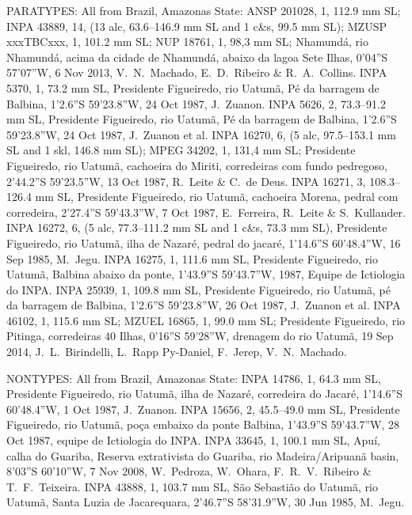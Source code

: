 \documentclass[12pt]{article}
\begin{document}
\noindent PARATYPES: All from Brazil, Amazonas State: ANSP 201028, 1, 112.9 mm SL; INPA 43889, 14, (13 alc, 63.6--146.9 mm SL and 1 c\&s, 99.5 mm SL); MZUSP xxxTBCxxx, 1, 101.2 mm SL; NUP 18761, 1, 98,3 mm SL; Nhamundá, rio Nhamundá, acima da cidade de Nhamundá, abaixo da lagoa Sete Ilhas, 0'04''S 57'07''W, 6 Nov 2013, V.\ N.\ Machado, E.\ D.\ Ribeiro \& R.\ A.\ Collins. %
INPA 5370, 1, 73.2 mm SL, Presidente Figueiredo, rio Uatumã, Pé da barragem de Balbina, 1’2.6”S 59’23.8”W, 24 Oct 1987, J.\ Zuanon. %
INPA 5626, 2, 73.3--91.2 mm SL, Presidente Figueiredo, rio Uatumã, Pé da barragem de Balbina, 1’2.6”S 59’23.8”W, 24 Oct 1987, J.\ Zuanon et al. %
INPA 16270, 6, (5 alc, 97.5--153.1 mm SL and 1 skl, 146.8 mm SL); MPEG 34202, 1, 131,4 mm SL; Presidente Figueiredo, rio Uatumã, cachoeira do Miriti, corredeiras com fundo pedregoso, 2’44.2”S 59’23.5”W, 13 Oct 1987, R.\ Leite \& C.\ de Deus. %
INPA 16271, 3, 108.3--126.4 mm SL, Presidente Figueiredo, rio Uatumã, cachoeira Morena, pedral com corredeira, 2’27.4”S 59’43.3”W, 7 Oct 1987, E.\ Ferreira, R.\ Leite \& S.\ Kullander. %
INPA 16272, 6, (5 alc, 77.3--111.2 mm SL and 1 c\&s, 73.3 mm SL), Presidente Figueiredo, rio Uatumã, ilha de Nazaré, pedral do jacaré, 1’14.6”S 60’48.4”W, 16 Sep 1985, M.\ Jegu. %
INPA 16275, 1, 111.6 mm SL, Presidente Figueiredo, rio Uatumã, Balbina abaixo da ponte, 1’43.9”S 59’43.7”W, 1987, Equipe de Ictiologia do INPA. %
INPA 25939, 1, 109.8 mm SL, Presidente Figueiredo, rio Uatumã, pé da barragem de Balbina, 1’2.6”S 59’23.8”W, 26 Oct 1987, J.\ Zuanon et al. %
INPA 46102, 1, 115.6 mm SL; MZUEL 16865, 1, 99.0 mm SL; Presidente Figueiredo, rio Pitinga, corredeiras 40 Ilhas, 0’16”S 59’28”W, drenagem do rio Uatumã, 19 Sep 2014, J.\ L.\ Birindelli, L.\ Rapp Py-Daniel, F.\ Jerep, V.\ N.\ Machado.\\
\bigskip

\noindent NONTYPES: All from Brazil, Amazonas State: %
INPA 14786, 1, 64.3 mm SL, Presidente Figueiredo, rio Uatumã, ilha de Nazaré, corredeira do Jacaré, 1’14.6”S 60’48.4”W, 1 Oct 1987, J.\ Zuanon. %
INPA 15656, 2, 45.5--49.0 mm SL, Presidente Figueiredo, rio Uatumã, poça embaixo da ponte Balbina, 1’43.9”S 59’43.7”W, 28 Oct 1987, equipe de Ictiologia do INPA. %
INPA 33645, 1, 100.1 mm SL, Apuí, calha do Guariba, Reserva extrativista do Guariba, rio Madeira/Aripuanã basin, 8’03”S 60’10”W, 7 Nov 2008, W.\ Pedroza, W.\ Ohara, F.\ R.\ V.\ Ribeiro \& T.\ F.\ Teixeira. %
INPA 43888, 1, 103.7 mm SL, São Sebastião do Uatumã, rio Uatumã, Santa Luzia de Jacarequara, 2’46.7”S 58’31.9”W, 30 Jun 1985, M.\ Jegu.\\%
\bigskip
\end{document}
